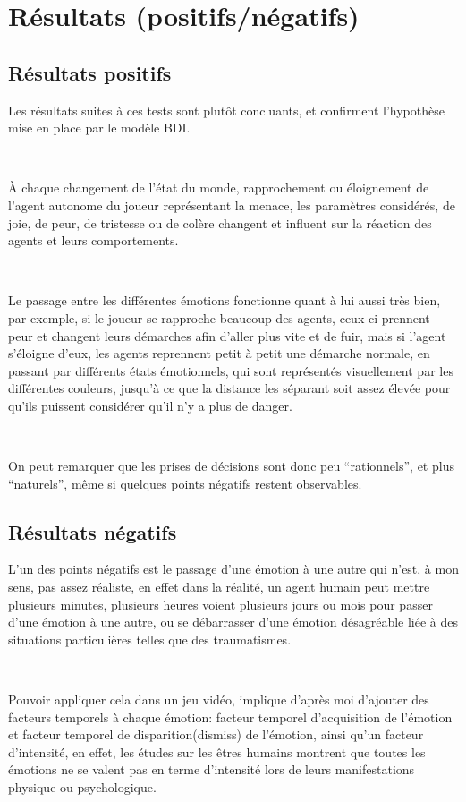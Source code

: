 \section{Résultats (positifs/négatifs)}

\subsection{Résultats positifs}

Les résultats suites à ces tests sont plutôt concluants, et confirment l’hypothèse mise en place par le modèle BDI.


~\par
À chaque changement de l’état du monde, rapprochement ou éloignement de l’agent autonome du joueur représentant la menace, les paramètres considérés, de joie, de peur, de tristesse ou de colère changent et influent sur la réaction des agents et leurs comportements.


~\par
Le passage entre les différentes émotions fonctionne quant à lui aussi très bien, par exemple, si le joueur se rapproche beaucoup des agents, ceux-ci prennent peur et changent leurs démarches afin d’aller plus vite et de fuir, mais si l’agent s’éloigne d’eux, les agents reprennent petit à petit une démarche normale, en passant par différents états émotionnels, qui sont représentés visuellement par les différentes couleurs, jusqu’à ce que la distance les séparant soit assez élevée pour qu’ils puissent considérer qu’il n’y a plus de danger.


~\par
On peut remarquer que les prises de décisions sont donc peu “rationnels”, et plus “naturels”, même si quelques points négatifs restent observables.

\subsection{Résultats négatifs}

L’un des points négatifs est le passage d’une émotion à une autre qui n’est, à mon sens, pas assez réaliste, en effet dans la réalité, un agent humain peut mettre plusieurs minutes, plusieurs heures voient plusieurs jours ou mois pour passer d’une émotion à une autre, ou se débarrasser d’une émotion désagréable liée à des situations particulières telles que des traumatismes.

~\par
Pouvoir appliquer cela dans un jeu vidéo, implique d'après moi d’ajouter des facteurs temporels à chaque émotion: facteur temporel d'acquisition de l’émotion et facteur temporel de disparition(dismiss) de l’émotion, ainsi qu'un facteur d’intensité, en effet, les études sur les êtres humains montrent que toutes les émotions ne se valent pas en terme d’intensité lors de leurs manifestations physique ou psychologique.







